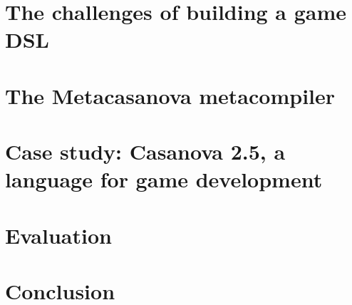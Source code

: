 \documentclass[lnicst]{svmultln}
\begin{document}
\section{The challenges of building a game DSL}
\label{sec:problem_statement}



\vspace{-0.6cm}
\section{The Metacasanova metacompiler}
\label{sec:formal_description}


\vspace{-0.6cm}
\section{Case study: Casanova 2.5, a language for game development}
\label{sec:casanova3}



\section{Evaluation}
\label{sec:evaluation}


\vspace{-1.2cm}
\section{Conclusion}
\label{sec:future_works}



%
%


\vspace{-0.75cm}


%
\end{document}
